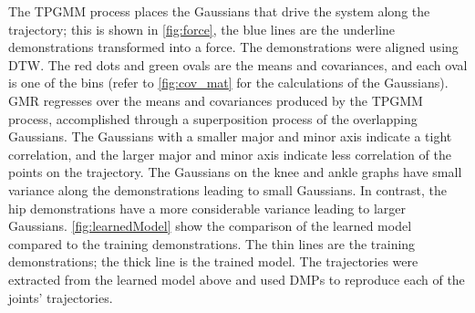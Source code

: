 The TPGMM process places the Gaussians that drive the system along the trajectory; this is shown in \autoref{fig:force}, the blue lines are the underline demonstrations transformed into a force.  The demonstrations were aligned using DTW. The red dots and green ovals are the means and covariances, and each oval is one of the bins (refer to \autoref{fig:cov_mat} for the calculations of the Gaussians).  GMR regresses over the means and covariances produced by the TPGMM process, accomplished through a superposition process of the overlapping Gaussians. The Gaussians with a smaller major and minor axis indicate a tight correlation, and the larger major and minor axis indicate less correlation of the points on the trajectory.  The Gaussians on the knee and ankle graphs have small variance along the demonstrations leading to small Gaussians. In contrast, the hip demonstrations have a more considerable variance leading to larger Gaussians. \autoref{fig:learnedModel} show the comparison of the learned model compared to the training demonstrations. The thin lines are the training demonstrations; the thick line is the trained model. The trajectories were extracted from the learned model above and used DMPs to reproduce each of the joints' trajectories. 


